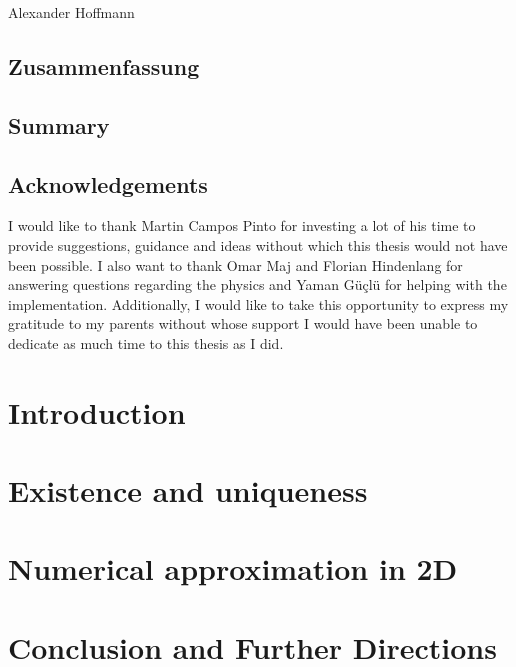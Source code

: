 \documentclass[12pt,a4paper,times]{report}
\numberwithin{equation}{section}
\numberwithin{figure}{section}
\numberwithin{lemma}{section}
\theoremstyle{definition}
\begin{document}
\noindent\hspace{1cm} Alexander Hoffmann
    \vspace{1cm}
\newpage
\thispagestyle{empty}
\section*{Zusammenfassung}

\vspace{1cm}
\section*{Summary}

\newpage

\thispagestyle{empty}
\section*{Acknowledgements}
I would like to thank Martin Campos Pinto for investing a lot of his time 
to provide suggestions, guidance and ideas without which this thesis would not have 
been possible. I also want to thank Omar Maj and Florian Hindenlang for answering questions regarding the physics 
and Yaman Güçlü for helping with the implementation. Additionally, I would like to take 
this opportunity to express my gratitude to my parents without whose support I would have 
been unable to dedicate as much time to this thesis as I did.
\newpage

\tableofcontents
\newpage
{}
\setcounter{page}{1}

\chapter*{Introduction}\label{chap:introduction}

\chapter{Existence and uniqueness}\label{chap:existence_and_uniqueness}

\chapter{Numerical approximation in 2D}\label{chap:approximation_in_2D}

\chapter{Conclusion and Further Directions}\label{chap:conclusion}

\printbibliography
\end{document}
